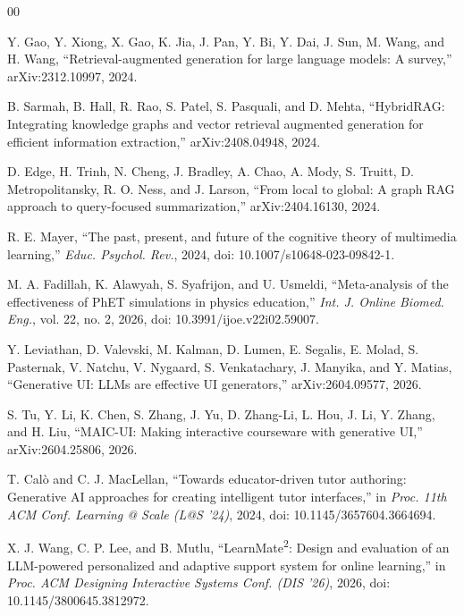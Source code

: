 \documentclass[conference]{IEEEtran}
\begin{document}
\begin{thebibliography}{00}

 Y. Gao, Y. Xiong, X. Gao, K. Jia, J. Pan, Y. Bi, Y. Dai, J. Sun, M. Wang, and H. Wang, ``Retrieval-augmented generation for large language models: A survey,'' arXiv:2312.10997, 2024.

 B. Sarmah, B. Hall, R. Rao, S. Patel, S. Pasquali, and D. Mehta, ``HybridRAG: Integrating knowledge graphs and vector retrieval augmented generation for efficient information extraction,'' arXiv:2408.04948, 2024.

 D. Edge, H. Trinh, N. Cheng, J. Bradley, A. Chao, A. Mody, S. Truitt, D. Metropolitansky, R. O. Ness, and J. Larson, ``From local to global: A graph RAG approach to query-focused summarization,'' arXiv:2404.16130, 2024.

 R. E. Mayer, ``The past, present, and future of the cognitive theory of multimedia learning,'' \emph{Educ. Psychol. Rev.}, 2024, doi: 10.1007/s10648-023-09842-1.

 M. A. Fadillah, K. Alawyah, S. Syafrijon, and U. Usmeldi, ``Meta-analysis of the effectiveness of PhET simulations in physics education,'' \emph{Int. J. Online Biomed. Eng.}, vol. 22, no. 2, 2026, doi: 10.3991/ijoe.v22i02.59007.

 Y. Leviathan, D. Valevski, M. Kalman, D. Lumen, E. Segalis, E. Molad, S. Pasternak, V. Natchu, V. Nygaard, S. Venkatachary, J. Manyika, and Y. Matias, ``Generative UI: LLMs are effective UI generators,'' arXiv:2604.09577, 2026.

 S. Tu, Y. Li, K. Chen, S. Zhang, J. Yu, D. Zhang-Li, L. Hou, J. Li, Y. Zhang, and H. Liu, ``MAIC-UI: Making interactive courseware with generative UI,'' arXiv:2604.25806, 2026.

 T. Cal\`o and C. J. MacLellan, ``Towards educator-driven tutor authoring: Generative AI approaches for creating intelligent tutor interfaces,'' in \emph{Proc. 11th ACM Conf. Learning @ Scale (L@S '24)}, 2024, doi: 10.1145/3657604.3664694.

 X. J. Wang, C. P. Lee, and B. Mutlu, ``LearnMate\textsuperscript{2}: Design and evaluation of an LLM-powered personalized and adaptive support system for online learning,'' in \emph{Proc. ACM Designing Interactive Systems Conf. (DIS '26)}, 2026, doi: 10.1145/3800645.3812972.


\end{thebibliography}
\end{document}
